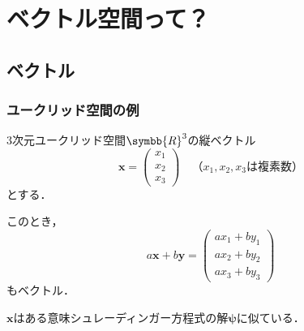 \documentclass[
    10pt,
    ]{sotsu-beamer}
\begin{document}
\section{ベクトル空間って？}

\subsection{ベクトル}


\begin{frame}
    \frametitle{ユークリッド空間の例}

    3次元ユークリッド空間$\symbb{R}^3$の縦ベクトル
    \begin{equation*}
        \symbf{x} = 
        \begin{pmatrix}
            x_1 \\ x_2  \\ x_3
        \end{pmatrix}
        \quad
        \text{（$x_1, x_2, x_3$は複素数）}
    \end{equation*}
    とする．

    このとき，
    \begin{equation*}
        a \symbf{x} + b \symbf{y}
        = \begin{pmatrix}
            a x_1 + b y_1  \\
            a x_2 + b y_2  \\
            a x_3 + b y_3
        \end{pmatrix}
    \end{equation*}
    もベクトル．

    \pause

    $\symbf{x}$はある意味\alert{シュレーディンガー方程式の解$\symbf{\psi}$に似ている}．

\end{frame}
\end{document}
